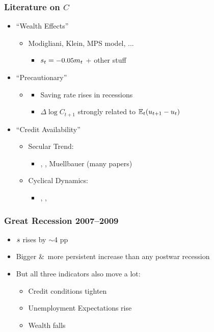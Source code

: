 \documentclass[pdflatex]{beamer}
\newcommand{\jemph}[1]{{\color{jirkasred}#1}}
\begin{document}
\begin{frame}\frametitle{\bf Literature on $C$ }

  \begin{itemize}
  \item \jemph{``Wealth Effects''}
    \begin{itemize}
    \item Modigliani, Klein, MPS model, ...
      \begin{itemize} \item $s_{t} = -0.05 m_{t}$ + other stuff
      \end{itemize}
    \end{itemize}
  \item \jemph{``Precautionary''}
    \begin{itemize}
    \item \cite{carroll:brookings}
      \begin{itemize}
      \item Saving rate rises in recessions
      \item $\Delta \log C_{t+1}$ strongly related to $\mathbb{E}_{t}(u_{t+1}-u_{t})$
      \end{itemize}
    \end{itemize}
  \item \jemph{``Credit Availability''}
    \begin{itemize}
    \item Secular Trend: \begin{itemize} \item \cite{parker_nberma_spendthrift}, \cite{dynanKohn07_indebtedness}, Muellbauer (many papers) \end{itemize}
    \item Cyclical Dynamics: \begin{itemize}
      \item \cite{glLiq}, \cite{gkLiq}, \cite{hall:slump} \end{itemize}
    \end{itemize}
  \end{itemize}


\end{frame}


\begin{frame}\frametitle{\textbf{Great Recession 2007--2009}}


  \begin{itemize}
  \item $s$ rises by $\sim$4 pp
  \item \jemph{Bigger \&\ more persistent increase} than any postwar recession
  \item But all three indicators also move a lot:
    \begin{itemize}
    \item Credit conditions tighten
    \item Unemployment Expectations rise
    \item Wealth falls
    \end{itemize}
  \end{itemize}

\end{frame}
\end{document}
